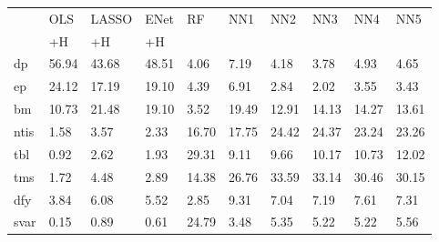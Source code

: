 \begin{tabularx}{\linewidth}{*{10}{X}}
\toprule
& OLS& LASSO& ENet& RF& NN1& NN2& NN3& NN4& NN5\\
& +H& +H& +H& & & & & & \\
\midrule
dp& 56.94& 43.68& 48.51& 4.06& 7.19& 4.18& 3.78& 4.93& 4.65\\
ep& 24.12& 17.19& 19.10& 4.39& 6.91& 2.84& 2.02& 3.55& 3.43\\
bm& 10.73& 21.48& 19.10& 3.52& 19.49& 12.91& 14.13& 14.27& 13.61\\
ntis& 1.58& 3.57& 2.33& 16.70& 17.75& 24.42& 24.37& 23.24& 23.26\\
tbl& 0.92& 2.62& 1.93& 29.31& 9.11& 9.66& 10.17& 10.73& 12.02\\
tms& 1.72& 4.48& 2.89& 14.38& 26.76& 33.59& 33.14& 30.46& 30.15\\
dfy& 3.84& 6.08& 5.52& 2.85& 9.31& 7.04& 7.19& 7.61& 7.31\\
svar& 0.15& 0.89& 0.61& 24.79& 3.48& 5.35& 5.22& 5.22& 5.56\\
\bottomrule
\end{tabularx}